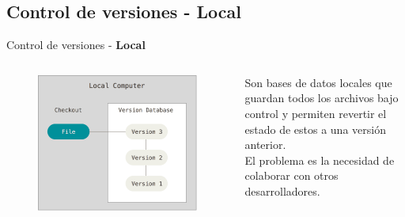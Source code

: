 \documentclass{beamer}
\begin{document}
\subsection{Control de versiones - \textbf{Local}}
\begin{frame}{Control de versiones - \textbf{Local}}
 \begin{columns}
\begin{figure}
  \centering
  \includegraphics[scale=0.2]{Imagenes/local_vcs}
 \end{figure}

 \footnotesize
 Son bases de datos locales que guardan todos los archivos bajo control y permiten revertir el estado de estos a una versión anterior.\\
 \vspace{2mm}
 \footnotesize
 El problema es la necesidad de colaborar con otros desarrolladores.
 \end{columns}
\end{frame}
\end{document}
